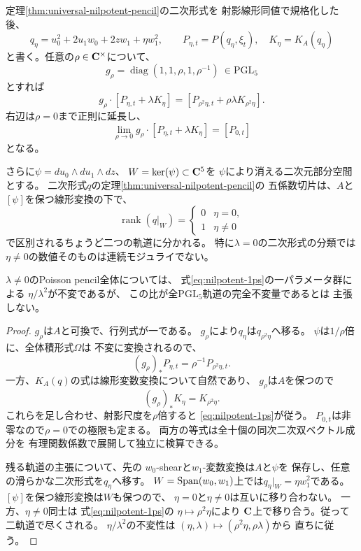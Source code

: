 \begin{theorem}[冪零不変二次形式の二層と一パラメータ退化]
\label{thm:nilpotent-torus-attraction}
定理\ref{thm:universal-nilpotent-pencil}の二次形式を
射影線形同値で規格化した後、
\[
 q_\eta=u_0^2+2u_1w_0+2zw_1+\eta w_1^2,\qquad
 P_{\eta,t}=P(q_\eta,\xi_t),\quad K_\eta=K_A(q_\eta)
\]
と書く。任意の$\rho\in\mathbf C^\times$について、
\[
 g_\rho=\operatorname{diag}(1,1,\rho,1,\rho^{-1})
 \ \in\mathrm{PGL}_5
\]
とすれば
\begin{equation}\label{eq:nilpotent-1ps}
 \boxed{\quad
 g_\rho\cdot[P_{\eta,t}+\lambda K_\eta]
   =[P_{\rho^2\eta,t}+\rho\lambda K_{\rho^2\eta}].
 \quad}
\end{equation}
右辺は$\rho=0$まで正則に延長し、
\begin{equation}\label{eq:nilpotent-1ps-limit}
 \lim_{\rho\to0}
 g_\rho\cdot[P_{\eta,t}+\lambda K_\eta]=[P_{0,t}]
\end{equation}
となる。

さらに$\psi=du_0\wedge du_1\wedge dz$、
$W=\ker(\psi)\subset\mathbf C^5$を
$\psi$により消える二次元部分空間とする。
二次形式$q$の定理\ref{thm:universal-nilpotent-pencil}の
五係数切片は、$A$と$[\psi]$を保つ線形変換の下で、
\[
 \operatorname{rank}(q|_W)=
 \begin{cases}0&\eta=0,\\1&\eta\ne0\end{cases}
\]
で区別されるちょうど二つの軌道に分かれる。
特に$\lambda=0$の二次形式の分類では
$\eta\ne0$の数値そのものは連続モジュライでない。

$\lambda\ne0$のPoisson pencil全体については、
式\eqref{eq:nilpotent-1ps}の一パラメータ群による
$\eta/\lambda^2$が不変であるが、
この比が全$\mathrm{PGL}_5$軌道の完全不変量であるとは
主張しない。
\end{theorem}
\begin{proof}
$g_\rho$は$A$と可換で、行列式が一である。
$g_\rho$により$q_\eta$は$q_{\rho^2\eta}$へ移る。
$\psi$は$1/\rho$倍に、全体積形式$\Omega$は
不変に変換されるので、
\[
 (g_\rho)_*P_{\eta,t}=\rho^{-1}P_{\rho^2\eta,t}.
\]
一方、$K_A(q)$の式は線形変数変換について自然であり、
$g_\rho$は$A$を保つので
\[
 (g_\rho)_*K_\eta=K_{\rho^2\eta}.
\]
これらを足し合わせ、射影尺度を$\rho$倍すると
\eqref{eq:nilpotent-1ps}が従う。
$P_{0,t}$は非零なので$\rho=0$での極限も定まる。
両方の等式は全十個の同次二次双ベクトル成分を
有理関数係数で展開して独立に検算できる。

残る軌道の主張について、先の
$w_0$-shearと$w_1$-変数変換は$A$と$\psi$を
保存し、任意の滑らかな二次形式を$q_\eta$へ移す。
$W=\operatorname{Span}(w_0,w_1)$上では$q_\eta|_W=\eta w_1^2$である。
$[\psi]$を保つ線形変換は$W$も保つので、
$\eta=0$と$\eta\ne0$は互いに移り合わない。
一方、$\eta\ne0$同士は
式\eqref{eq:nilpotent-1ps}の
$\eta\mapsto\rho^2\eta$により
$\mathbf C$上で移り合う。従って二軌道で尽くされる。
$\eta/\lambda^2$の不変性は
$(\eta,\lambda)\mapsto(\rho^2\eta,\rho\lambda)$から
直ちに従う。
\end{proof}

